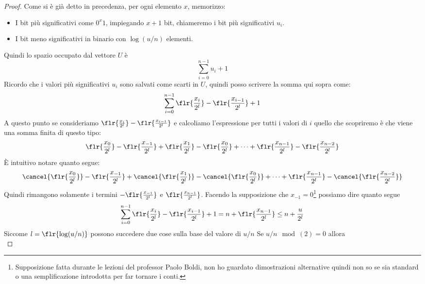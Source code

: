 \begin{proof}
	Come si è già detto in precedenza, per ogni elemento $x$, memorizzo:
	\begin{itemize}
		\item I bit più significativi come $0^x1$, impiegando $x + 1$ bit, chiameremo i bit più significativi $u_i$.
		\item I bit meno significativi in binario con $\log(u/n)$ elementi.
	\end{itemize}
	Quindi lo spazio occupato dal vettore $U$ è
	\begin{equation}
		\sum_{i = 0}^{n - 1}{u_i + 1}
	\end{equation}
	Ricordo che i valori più significativi $u_i$ sono salvati come scarti in $U$, quindi posso scrivere la somma qui sopra come:
	\begin{equation}
		\sum_{i = 0}^{n - 1}{\flr{\frac{x_i}{2^l}} - \flr{\frac{x_{i - 1}}{2^l}} + 1}
	\end{equation}
	A questo punto se consideriamo $\flr{\frac{x_i}{2^l}} - \flr{\frac{x_{i - 1}}{2^l}}$ e calcoliamo l'espressione per tutti i valori di $i$ quello che scopriremo è che viene una somma finita di questo tipo:
	\begin{equation}
		\flr{\frac{x_0}{2^l}} - \flr{\frac{x_{- 1}}{2^l}} + \flr{\frac{x_1}{2^l}} - \flr{\frac{x_{0}}{2^l}} + \dots + \flr{\frac{x_{n - 1}}{2^l}} - \flr{\frac{x_{n - 2}}{2^l}}
	\end{equation}
	È intuitivo notare quanto segue:
	\begin{equation}
		\cancel{\flr{\frac{x_0}{2^l}}} - \flr{\frac{x_{- 1}}{2^l}} + \cancel{\flr{\frac{x_1}{2^l}}} - \cancel{\flr{\frac{x_{0}}{2^l}}} + \dots + \flr{\frac{x_{n - 1}}{2^l}} - \cancel{\flr{\frac{x_{n - 2}}{2^l}}}
	\end{equation}
	Quindi rimangono solamente i termini $- \flr{\frac{x_{- 1}}{2^l}}$ e $\flr{\frac{x_{n - 1}}{2^l}}$. Facendo la supposizione che $x_{- 1} = 0$\footnote{Supposizione fatta durante le lezioni del professor Paolo Boldi, non ho guardato dimostrazioni alternative quindi non so se sia standard o una semplificazione introdotta per far tornare i conti.} possiamo dire quanto segue
	\begin{equation}
		\sum_{i = 0}^{n - 1}{\flr{\frac{x_i}{2^l}} - \flr{\frac{x_{i - 1}}{2^l}} + 1} = n + \flr{\frac{x_{n - 1}}{2^l}} \leq n + \frac{u}{2^l}
	\end{equation}
	Siccome $l = \flr{\log(u/n)}$ possono succedere due cose sulla base del valore di $u/n$
	Se $u/n \mod(2) = 0$ allora
	\begin{equation}

\end{equation}
\end{proof}
